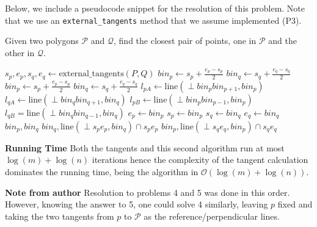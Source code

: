 \documentclass[a4paper, 10pt]{article}
\begin{document}
Below, we include a pseudocode snippet for the resolution of this problem. Note that we use an \texttt{external\_tangents} method that we assume implemented (P3).%
\begin{algorithm}
    \caption{Given two polygons $\mathcal{P}$ and $\mathcal{Q}$, find the closest pair of points, one in $\mathcal{P}$ and the other in $\mathcal{Q}$. \label{alg:closest-poly}}
  \begin{multicols}{2}
  \begin{algorithmic}[1]
        \State $s_p, e_p, s_q, e_q \gets \text{external\_tangents}(P, Q)$
        \State $bin_p \gets s_p + \frac{e_p - s_p}{2}$
        \State $bin_q \gets s_q + \frac{e_q - s_q}{2}$
            \State $bin_p \gets s_p + \frac{e_p - s_p}{2}$
            \State $bin_q \gets s_q + \frac{e_q - s_q}{2}$
            \State $l_{pA} \gets \text{line}(\perp bin_pbin_{p+1}, bin_p)$
            \State $l_{qA} \gets \text{line}(\perp bin_qbin_{q+1}, bin_q)$
            \State $l_{pB} \gets \text{line}(\perp bin_pbin_{p-1}, bin_p)$ 
            \State $l_{qB} = \text{line}(\perp bin_qbin_{q-1}, bin_q)$
            \Switch{}
                    \State $e_p \gets bin_p$
                \EndCase
                    \State $s_p \gets bin_p$
                \EndCase
                    \State $s_q \gets bin_q$
                \EndCase
                    \State $e_q \gets bin_q$
                \EndCase
                    \State \Return $bin_p, bin_q$
                \EndCase
            \EndSwitch
        \EndWhile
            \State \Return $bin_q, \text{line}(\perp s_pe_p, bin_q) \cap s_pe_p$
        \Else
            \State \Return $bin_p, \text{line}(\perp s_qe_q, bin_p) \cap s_qe_q$
        \EndIf
  \end{algorithmic}
  \end{multicols}
\end{algorithm}

\textbf{Running Time} Both the tangents and this second algorithm run at most $\log(m) + \log(n)$ iterations hence the complexity of the tangent calculation dominates the running time, being the algorithm in $\mathcal{O}(\log(m) + \log(n))$.

\vfill

\textbf{Note from author} Resolution to problems 4 and 5 was done in this order. However, knowing the answer to 5, one could solve 4 similarly, leaving $p$ fixed and taking the two tangents from $p$ to $\mathcal{P}$ as the reference/perpendicular lines.
\end{document}
